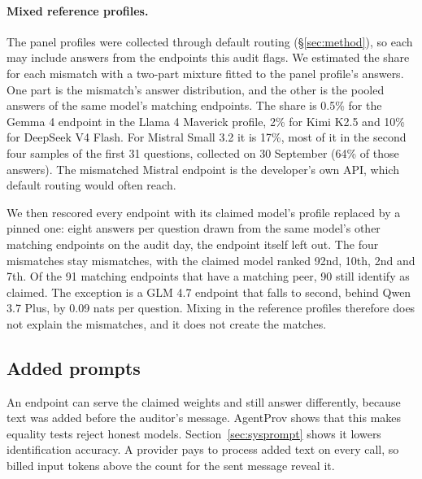 \documentclass[11pt]{article}
\begin{document}
\paragraph{Mixed reference profiles.} The panel profiles were collected through default routing
(\S\ref{sec:method}), so each may include answers from the endpoints this audit flags. We
estimated the share for each mismatch with a two-part mixture fitted to the panel profile's
answers. One part is the mismatch's answer distribution, and the other is the pooled answers of
the same model's matching endpoints. The share is 0.5\% for the Gemma 4 endpoint in the Llama 4
Maverick profile, 2\% for Kimi K2.5 and 10\% for DeepSeek V4 Flash. For Mistral Small 3.2 it is
17\%, most of it in the second four samples of the first 31 questions, collected on 30 September
(64\% of those answers). The mismatched Mistral endpoint is the developer's own API, which default
routing would often reach.

We then rescored every endpoint with its claimed model's profile replaced by a pinned one: eight
answers per question drawn from the same model's other matching endpoints on the audit day, the
endpoint itself left out. The four mismatches stay mismatches, with the claimed model ranked 92nd,
10th, 2nd and 7th. Of the 91 matching endpoints that have a matching peer, 90 still identify as
claimed. The exception is a GLM 4.7 endpoint that falls to second, behind Qwen 3.7 Plus, by 0.09
nats per question. Mixing in the reference profiles therefore does not explain the mismatches,
and it does not create the matches.

\subsection{Added prompts}
\label{sec:added}

An endpoint can serve the claimed weights and still answer differently, because text was added
before the auditor's message. AgentProv shows that this makes equality tests reject honest models.
Section~\ref{sec:sysprompt} shows it lowers identification accuracy. A provider pays to process
added text on every call, so billed input tokens above the count for the sent message reveal it.
\end{document}
